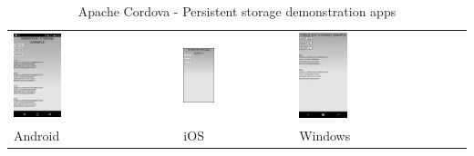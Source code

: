 \documentclass[english,master,public,dept460,male,cpdeclaration,oneside]{diploma}
\begin{document}
\begin{table}[!h]
	\centering
	\caption{Apache Cordova - Persistent storage demonstration apps}
	\label{table:cordova2}
	\begin{tabular}{p{5cm} | p{5cm} | p{5cm} }
		\toprule		
		\includegraphics[width=0.3\textwidth]{Figures/cordova2android.PNG}
		& \includegraphics[width=0.3\textwidth]{Figures/cordova2ios.PNG}
		& \includegraphics[width=0.3\textwidth]{Figures/cordova2windows.PNG}
		\\
		Android & iOS & Windows \\
		\midrule
	\end{tabular}
\end{table}
\end{document}
